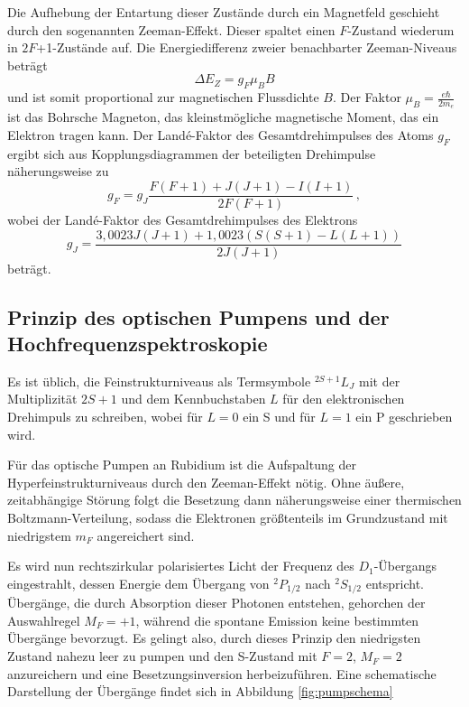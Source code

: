  Die Aufhebung der Entartung dieser Zustände durch ein Magnetfeld geschieht durch den sogenannten Zeeman-Effekt. Dieser spaltet einen $F$-Zustand wiederum in $2F$+1-Zustände auf. Die Energiedifferenz zweier benachbarter Zeeman-Niveaus beträgt
  \begin{equation}
    \Delta E_Z = g_F \mu_B B
    \label{eqn:zeemanDifferenz}
  \end{equation}
  und ist somit proportional zur magnetischen Flussdichte $B$. Der Faktor $\mu_B = \frac{e \hbar}{2m_e}$ ist das Bohrsche Magneton, das kleinstmögliche magnetische Moment, das ein Elektron tragen kann. Der Landé-Faktor des Gesamtdrehimpulses des Atoms $g_F$ ergibt sich aus Kopplungsdiagrammen der beteiligten Drehimpulse näherungsweise zu
  \begin{equation}
    g_F = g_J \frac{F(F+1)+J(J+1)-I(I+1)}{2F(F+1)}\,,
    \label{eqn:g_F_Theorie}
  \end{equation}
  wobei der Landé-Faktor des Gesamtdrehimpulses des Elektrons
  \begin{equation}
    g_J = \frac{3{,}0023J(J+1)+1{,}0023(S(S+1)-L(L+1))}{2J(J+1)}
    \label{eqn:g_J_Theorie}
  \end{equation}
  beträgt.

  \subsection{Prinzip des optischen Pumpens und der Hochfrequenzspektroskopie}
  \label{subsec:prinzipOptischesPumpen}

  Es ist üblich, die Feinstrukturniveaus als Termsymbole ${}^{2S+1}L_J$ mit der Multiplizität $2S+1$ und dem Kennbuchstaben $L$ für den elektronischen Drehimpuls zu schreiben, wobei für $L=0$ ein S und für $L=1$ ein P geschrieben wird.

  Für das optische Pumpen an Rubidium ist die Aufspaltung der Hyperfeinstrukturniveaus durch den Zeeman-Effekt nötig. Ohne äußere, zeitabhängige Störung folgt die Besetzung dann näherungsweise einer thermischen Boltzmann-Verteilung, sodass die Elektronen größtenteils im Grundzustand mit niedrigstem $m_F$ angereichert sind.

  Es wird nun rechtszirkular polarisiertes Licht der Frequenz des $D_1$-Übergangs eingestrahlt, dessen Energie dem Übergang von ${}^{2}P_{1/2}$ nach ${}^{2}S_{1/2}$ entspricht. Übergänge, die durch Absorption dieser Photonen entstehen, gehorchen der Auswahlregel $M_F=+1$, während die spontane Emission keine bestimmten Übergänge bevorzugt. Es gelingt also, durch dieses Prinzip den niedrigsten Zustand nahezu leer zu pumpen und den S-Zustand mit $F=2$, $M_F=2$ anzureichern und eine Besetzungsinversion herbeizuführen. Eine schematische Darstellung der Übergänge findet sich in Abbildung \ref{fig:pumpschema}

